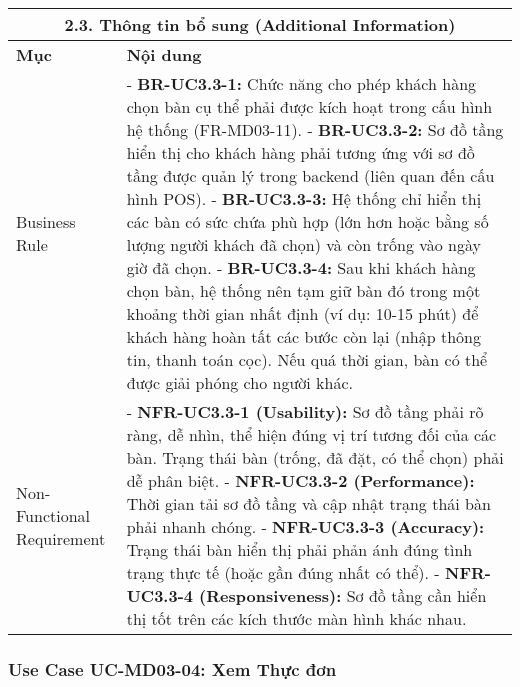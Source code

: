 \begin{longtable}{|m{4cm}|p{11cm}|}
\hline
\multicolumn{2}{|c|}{\textbf{2.3. Thông tin bổ sung (Additional Information)}} \\
\hline
\textbf{Mục} & \textbf{Nội dung} \\
\hline
Business Rule & - \textbf{BR-UC3.3-1:} Chức năng cho phép khách hàng chọn bàn cụ thể phải được kích hoạt trong cấu hình hệ thống (FR-MD03-11). \newline - \textbf{BR-UC3.3-2:} Sơ đồ tầng hiển thị cho khách hàng phải tương ứng với sơ đồ tầng được quản lý trong backend (liên quan đến cấu hình POS). \newline - \textbf{BR-UC3.3-3:} Hệ thống chỉ hiển thị các bàn có sức chứa phù hợp (lớn hơn hoặc bằng số lượng người khách đã chọn) và còn trống vào ngày giờ đã chọn. \newline - \textbf{BR-UC3.3-4:} Sau khi khách hàng chọn bàn, hệ thống nên tạm giữ bàn đó trong một khoảng thời gian nhất định (ví dụ: 10-15 phút) để khách hàng hoàn tất các bước còn lại (nhập thông tin, thanh toán cọc). Nếu quá thời gian, bàn có thể được giải phóng cho người khác. \\
\hline
Non-Functional Requirement & - \textbf{NFR-UC3.3-1 (Usability):} Sơ đồ tầng phải rõ ràng, dễ nhìn, thể hiện đúng vị trí tương đối của các bàn. Trạng thái bàn (trống, đã đặt, có thể chọn) phải dễ phân biệt. \newline - \textbf{NFR-UC3.3-2 (Performance):} Thời gian tải sơ đồ tầng và cập nhật trạng thái bàn phải nhanh chóng. \newline - \textbf{NFR-UC3.3-3 (Accuracy):} Trạng thái bàn hiển thị phải phản ánh đúng tình trạng thực tế (hoặc gần đúng nhất có thể). \newline - \textbf{NFR-UC3.3-4 (Responsiveness):} Sơ đồ tầng cần hiển thị tốt trên các kích thước màn hình khác nhau. \\
\hline
\end{longtable}

\subsubsection{Use Case UC-MD03-04: Xem Thực đơn}

